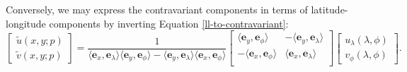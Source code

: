 Conversely, we may express the contravariant components in terms of
latitude-longitude components by inverting Equation \eqref{ll-to-contravariant}:
\begin{equation}
	\label{contravariant-to-ll}
	\begin{bmatrix}
		\tilde{u}(x,y;p) \\
		\tilde{v}(x,y;p)
	\end{bmatrix}
	=
	\frac{1}{\langle \boldsymbol{e}_x, \boldsymbol{e}_\lambda\rangle
	\langle \boldsymbol{e}_y, \boldsymbol{e}_\phi \rangle
	-\langle \boldsymbol{e}_y, \boldsymbol{e}_\lambda \rangle
	\langle \boldsymbol{e}_x, \boldsymbol{e}_\phi \rangle}
	\begin{bmatrix}
		  \langle \boldsymbol{e}_y, \boldsymbol{e}_\phi \rangle 
		&-\langle \boldsymbol{e}_y, \boldsymbol{e}_\lambda \rangle \\
		 -\langle \boldsymbol{e}_x, \boldsymbol{e}_\phi \rangle 
		& \langle \boldsymbol{e}_x, \boldsymbol{e}_\lambda \rangle \\
	\end{bmatrix}
	\begin{bmatrix}
		 u_\lambda (\lambda, \phi) \\
		 v_\phi (\lambda, \phi) 
	\end{bmatrix}.
\end{equation}

